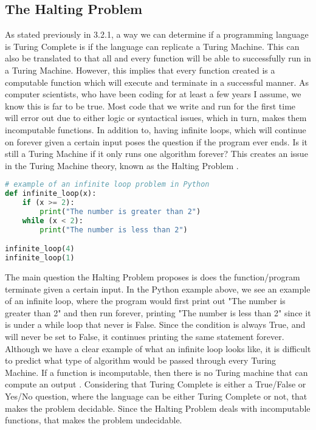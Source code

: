 \documentclass{article}
\begin{document}
\subsection{The Halting Problem}
As stated previously in 3.2.1, a way we can determine if a programming language is Turing Complete is if the language can replicate a Turing Machine. This can also be translated to that all and every function will be able to successfully run in a Turing Machine. However, this implies that every function created is a computable function which will execute and terminate in a successful manner. As computer scientists, who have been coding for at least a few years I assume, we know this is far to be true. Most code that we write and run for the first time will error out due to either logic or syntactical issues, which in turn, makes them incomputable functions. In addition to, having infinite loops, which will continue on forever given a certain input poses the question if the program ever ends. Is it still a Turing Machine if it only runs one algorithm forever? This creates an issue in the Turing Machine theory, known as the Halting Problem \cite{Turing Completeness}.

\begin{lstlisting}[language=Python]
# example of an infinite loop problem in Python
def infinite_loop(x):
    if (x >= 2):
        print("The number is greater than 2")
    while (x < 2):
        print("The number is less than 2")

infinite_loop(4)
infinite_loop(1)

\end{lstlisting}
\noindent

 \medskip\noindent
 The main question the Halting Problem proposes is does the function/program terminate given a certain input. In the Python example above, we see an example of an infinite loop, where the program would first print out "The number is greater than 2" and then run forever, printing "The number is less than 2" since it is under a while loop that never is False. Since the condition is always True, and will never be set to False, it continues printing the same statement forever. Although we have a clear example of what an infinite loop looks like, it is difficult to predict what type of algorithm would be passed through every Turing Machine. If a function is incomputable, then there is no Turing machine that can compute an output \cite{Turing Completeness}. Considering that Turing Complete is either a True/False or Yes/No question, where the language can be either Turing Complete or not, that makes the problem decidable. Since the Halting Problem deals with incomputable functions, that makes the problem undecidable.
 
\end{document}
